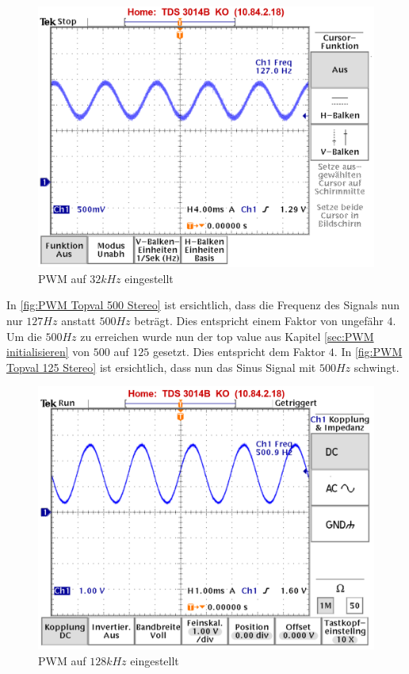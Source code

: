 \begin{figure}
\center
\includegraphics[scale=1.0]{data/TOPVAL_Stereo_500.png}
\caption{PWM auf $32kHz$ eingestellt}
\label{fig:PWM Topval 500 Stereo}
\end{figure}

In \autoref{fig:PWM Topval 500 Stereo} ist ersichtlich, dass die Frequenz des Signals nun nur $127Hz$ anstatt $500Hz$ beträgt. Dies entspricht einem Faktor von ungefähr $4$. Um die $500Hz$ zu erreichen wurde nun der top value aus Kapitel \ref{sec:PWM initialisieren} von $500$ auf $125$ gesetzt. Dies entspricht dem Faktor $4$. In \autoref{fig:PWM Topval 125 Stereo} ist ersichtlich, dass nun das Sinus Signal mit $500Hz$ schwingt.
\newpage

\begin{figure}[ht!]
\center
\includegraphics[scale=1.0]{data/TOPVAL_Stereo_125.png}
\caption{PWM auf $128kHz$ eingestellt}
\label{fig:PWM Topval 125 Stereo}
\end{figure}

